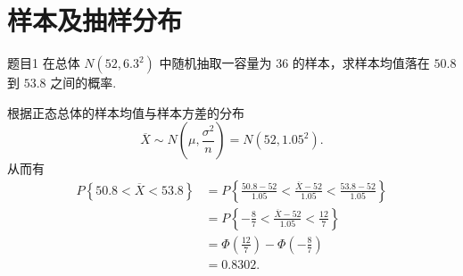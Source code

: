 \section{样本及抽样分布}


\begin{question}{题目1}
    在总体 $N(52, 6.3^2)$ 中随机抽取一容量为 36 的样本，求样本均值落在 $50.8$ 到 $53.8$ 之间的概率.
\end{question}
\begin{solution}
    根据正态总体的样本均值与样本方差的分布
    $$
        \overline{X} \sim N\left(\mu, \frac{\sigma^2}{n}\right) = N(52, 1.05^2).
    $$
    从而有
    $$
        \begin{aligned}
            P\left\{50.8 < \overline{X} < 53.8\right\}
             & = P\left\{\frac{50.8-52}{1.05} < \frac{\overline{X}-52}{1.05} < \frac{53.8-52}{1.05} \right\} \\
             & = P\left\{-\frac{8}{7} < \frac{\overline{X}-52}{1.05} < \frac{12}{7} \right\}                 \\
             & = \Phi\left(\frac{12}{7}\right) - \Phi\left(-\frac{8}{7}\right)                               \\
             & = 0.8302.
        \end{aligned}
    $$
\end{solution}


